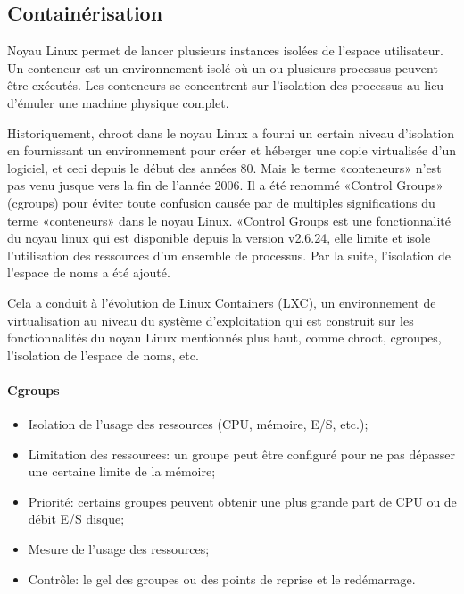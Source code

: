 \begin{onehalfspace}
\begin{itemize}
\end{itemize}

\subsection{Containérisation}

Noyau Linux permet de lancer plusieurs instances isolées de l'espace utilisateur. Un conteneur est un environnement isolé où un ou plusieurs processus peuvent être exécutés. Les conteneurs se concentrent sur l'isolation des processus au lieu d'émuler une machine physique complet.

Historiquement, chroot dans le noyau Linux a fourni un certain niveau d'isolation en fournissant un environnement pour créer et héberger une copie virtualisée d'un logiciel, et ceci depuis le début des années 80. Mais le terme «conteneurs» n'est pas venu jusque vers la fin de l'année 2006. Il a été renommé «Control Groups» (cgroups) pour éviter toute confusion causée par de multiples significations du terme «conteneurs» dans le noyau Linux. «Control Groups est une fonctionnalité du noyau linux qui est disponible depuis la version v2.6.24, elle limite et isole l'utilisation des ressources d'un ensemble de processus. Par la suite, l'isolation de l'espace de noms a été ajouté.

Cela a conduit à l'évolution de Linux Containers (LXC), un environnement de virtualisation au niveau du système d'exploitation qui est construit sur les fonctionnalités du noyau Linux mentionnés plus haut, comme chroot, cgroupes, l'isolation de l'espace de noms, etc.

\paragraph{Cgroups}

\begin{itemize}
\item Isolation de l'usage des ressources (CPU, mémoire, E/S, etc.);
\item Limitation des ressources: un groupe peut être configuré pour ne pas dépasser une certaine limite de la mémoire;
\item Priorité: certains groupes peuvent obtenir une plus grande part de CPU ou de débit E/S disque;
\item Mesure de l'usage des ressources;
\item Contrôle: le gel des groupes ou des points de reprise et le redémarrage.
\end{itemize}


\end{onehalfspace}
